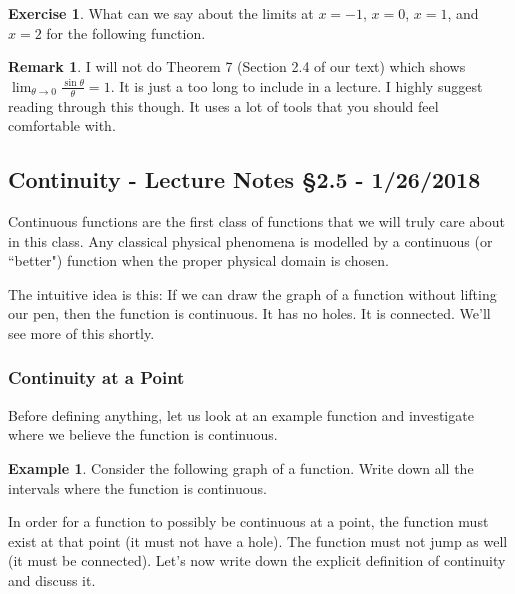 \documentclass[leqno]{article}
\theoremstyle{definition}
\newtheorem{remark}{Remark}[section]
\newtheorem{example}{Example}[section]
\newtheorem{exercise}{Exercise}[section]
\theoremstyle{remark}
\theoremstyle{theorem}
\begin{document}
\begin{exercise}
What can we say about the limits at $x=-1$, $x=0$, $x=1$, and $x=2$ for the following function.
\vspace*{6cm}
\end{exercise}

\begin{remark}
I will not do Theorem 7 (Section 2.4 of our text) which shows $\lim_{\theta \to 0} \frac{\sin \theta}{\theta}=1$.  It is just a too long to include in a lecture.  I highly suggest reading through this though.  It uses a lot of tools that you should feel comfortable with.
\end{remark}

\subsection{Continuity - Lecture Notes \S 2.5 - 1/26/2018}
Continuous functions are the first class of functions that we will truly care about in this class.  Any classical physical phenomena is modelled by a continuous (or ``better") function when the proper physical domain is chosen.  

The intuitive idea is this: If we can draw the graph of a function without lifting our pen, then the function is continuous.  It has no holes.  It is connected.  We'll see more of this shortly.

\subsubsection{Continuity at a Point}

Before defining anything, let us look at an example function and investigate where we believe the function is continuous.  

\begin{example}
Consider the following graph of a function.  Write down all the intervals where the function is continuous.
\vspace*{6cm}
\end{example}

In order for a function to possibly be continuous at a point, the function must exist at that point (it must not have a hole).  The function must not jump as well (it must be connected). Let's now write down the explicit definition of continuity and discuss it.
\end{document}
